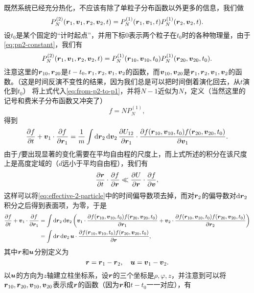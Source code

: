 既然系统已经充分热化，不应该有除了单粒子分布函数以外更多的信息，我们做
\begin{equation}
    P^{(2)}_N(\vb*{r}_1, \vb*{v}_1, \vb*{r}_2, \vb*{v}_2, t) = P^{(1)}_N(\vb*{r}_1, \vb*{v}_1, t) P^{(1)}_N(\vb*{r}_2, \vb*{v}_2, t).
\end{equation}
设$t_0$是某个固定的“计时起点”，并用下标0表示两个粒子在$t_0$时的各种物理量，由于\eqref{eq:pn2-constant}，我们有
\[
    P^{(2)}_N(\vb*{r}_1, \vb*{v}_1, \vb*{r}_2, \vb*{v}_2, t) = P^{(1)}_N(\vb*{r}_{10}, \vb*{v}_{10}, t_0) P^{(1)}_N(\vb*{r}_{20}, \vb*{v}_{20}, t_0).
\]
注意这里的$\vb*{r}_{10}, \vb*{r}_{20}$是$t-t_0,\vb*{r}_1,\vb*{r}_2,\vb*{v}_1, \vb*{v}_2$的函数，而$\vb*{v}_{10}, \vb*{v}_{20}$是$\vb*{r}_1,\vb*{r}_2,\vb*{v}_1, \vb*{v}_2$的函数。（这是时间反演不变性的结果，因为我们总是可以把时间倒着演化回去，从$t$演化到$t_0$）
将上式代入\eqref{eq:from-p2-to-p1}，并将$N-1$近似为$N$，定义（当然这里的记号和费米子分布函数又冲突了）
\begin{equation}
    f=NP_N^{(1)},
\end{equation}
得到
\[
    \pdv{f}{t} + \vb*{v}_1 \cdot \pdv{f}{\vb*{r}_1} = \frac{1}{m} \int \dd{\vb*{r}_2} \dd{\vb*{v}_2} \pdv{U_{12}}{\vb*{r}_1} \cdot \pdv{f(\vb*{r}_{10}, \vb*{v}_{10}, t_0) f(\vb*{r}_{20}, \vb*{v}_{20}, t_0)}{\vb*{v}_1}.
\]
由于$f$要出现显著的变化需要在平均自由程的尺度上，而上式所述的积分在该尺度上是高度定域的（$d$远小于平均自由程），我们有
\[
    \pdv{\vb*{r}}{t} \cdot \pdv{f}{\vb*{r}} \ll \pdv{U}{\vb*{r}} \cdot \pdv{f}{\vb*{v}},
\]
这样可以将\eqref{eq:effective-2-particle}中的时间偏导数项去掉，而对$\vb*{r}_2$的偏导数对$\dd{\vb*{r}_2}$积分之后得到表面项，为零，于是
\[
    \begin{aligned}
        \pdv{f}{t} + \vb*{v}_1 \cdot \pdv{f}{\vb*{r}_1} &= \int \dd{\vb*{r}_2} \dd{\vb*{v}_2} \left( \vb*{v}_1 \cdot \pdv{f(\vb*{r}_{10}, \vb*{v}_{10}, t_0) f(\vb*{r}_{20}, \vb*{v}_{20}, t_0)}{\vb*{r}_1} + \vb*{v}_2 \cdot \pdv{f(\vb*{r}_{10}, \vb*{v}_{10}, t_0) f(\vb*{r}_{20}, \vb*{v}_{20}, t_0)}{\vb*{r}_2} \right) \\
        &= \int \dd{\vb*{r}} \dd{\vb*{v}_2} \vb*{u} \cdot \pdv{f(\vb*{r}_{10}, \vb*{v}_{10}, t_0) f(\vb*{r}_{20}, \vb*{v}_{20}, t_0)}{\vb*{r}},
    \end{aligned}
\]
其中$\vb*{r}$和$\vb*{u}$分别定义为
\begin{equation}
    \vb*{r} = \vb*{r}_1 - \vb*{r}_2, \quad \vb*{u} = \vb*{v}_1 - \vb*{v}_2.
\end{equation}
以$\vb*{u}$的方向为$z$轴建立柱坐标系，设$\vb*{r}$的三个坐标是$\rho, \varphi, z$，并注意到可以将$\vb*{r}_{10}, \vb*{r}_{20}, \vb*{v}_{10}, \vb*{v}_{20}$表示成$\vb*{r}$的函数（因为$\vb*{r}$和$t-t_0$一一对应），有
